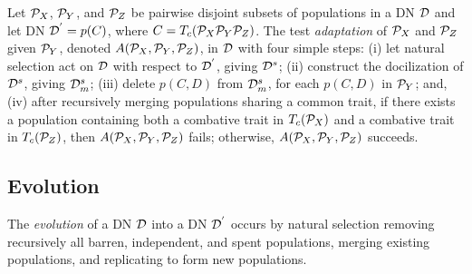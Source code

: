 Let ${\cal{P}}_X$, ${\cal{P}}_Y$, and ${\cal{P}}_Z$ be pairwise disjoint subsets of populations in a DN $\cal D$ and let DN ${\cal{D}}^{'} = {p(C)}$, where $C = T_c({\cal{P}}_X {\cal{P}}_Y {\cal{P}}_Z)$. 
The test \emph{adaptation} of ${\cal{P}}_X$ and ${\cal{P}}_Z$ given ${\cal{P}}_Y$, denoted $A({\cal{P}}_X,{\cal{P}}_Y,{\cal{P}}_Z)$, in $\cal D$ with four simple steps:
(i) let natural selection act on $\cal{D}$ with respect to ${\cal{D}}^{'}$, giving ${\cal{D}}^{s}$;
(ii) construct the docilization of ${\cal{D}}^{s}$, giving ${\cal{D}}^s_m$;
(iii) delete $p(C,D)$ from ${\cal{D}}^s_m$, for each $p(C,D)$ in ${\cal{P}}_Y$; and,
(iv) after recursively merging populations sharing a common trait, if there exists a population containing both a combative trait in $T_c({\cal{P}}_X)$ and a combative trait in $T_c({\cal{P}}_Z)$, then $A({\cal{P}}_X,{\cal{P}}_Y,{\cal{P}}_Z)$ fails; otherwise, $A({\cal{P}}_X,{\cal{P}}_Y,{\cal{P}}_Z)$ succeeds.


\subsection{Evolution}
\label{subsec:evolution}


The \emph{evolution} of a DN $\cal{D}$ into a DN ${\cal{D}}^{'}$ occurs by natural selection removing recursively all barren, independent, and spent populations, merging existing populations, and replicating to form new populations.


